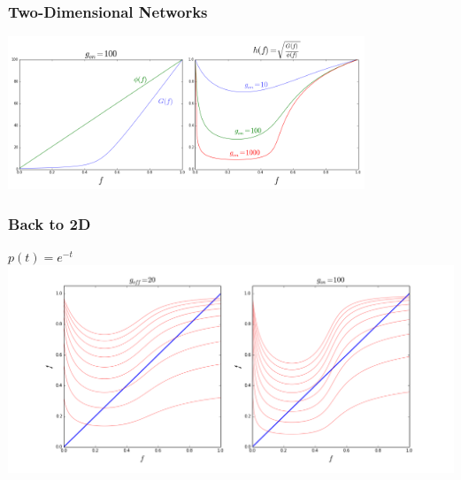 \documentclass[mathserif]{beamer}
\begin{document}
\begin{frame}
\frametitle{Two-Dimensional Networks}
\begin{center}
\includegraphics[width=0.8\textwidth]{MF_upper_limit.png}
\end{center}

\end{frame}
\begin{frame}
\frametitle{Back to 2D}
$p(t) = e^{-t}$
\includegraphics[width=\textwidth]{2D_MF_expon.png}

\end{frame}
\end{document}

